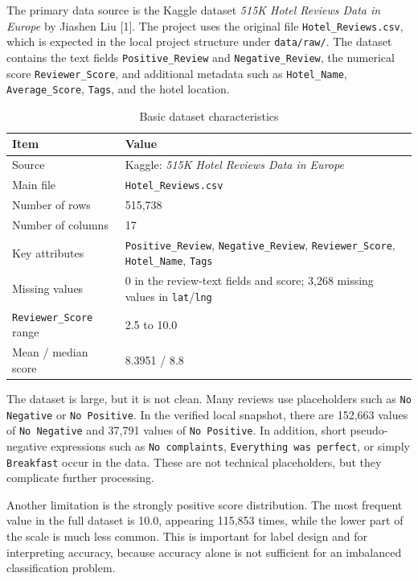\documentclass[twoside, 12pt]{article}
\begin{document}
The primary data source is the Kaggle dataset \emph{515K Hotel Reviews Data in Europe} by Jiashen Liu [1]. The project uses the original file \texttt{Hotel\_Reviews.csv}, which is expected in the local project structure under \texttt{data/raw/}. The dataset contains the text fields \texttt{Positive\_Review} and \texttt{Negative\_Review}, the numerical score \texttt{Reviewer\_Score}, and additional metadata such as \texttt{Hotel\_Name}, \texttt{Average\_Score}, \texttt{Tags}, and the hotel location.

\begin{table}[H]
\centering
\caption{Basic dataset characteristics}
\begin{tabular}{|p{5.2cm}|p{8cm}|}
\hline
\textbf{Item} & \textbf{Value} \\ \hline
Source & Kaggle: \emph{515K Hotel Reviews Data in Europe} \\ \hline
Main file & \texttt{Hotel\_Reviews.csv} \\ \hline
Number of rows & 515,738 \\ \hline
Number of columns & 17 \\ \hline
Key attributes & \texttt{Positive\_Review}, \texttt{Negative\_Review}, \texttt{Reviewer\_Score}, \texttt{Hotel\_Name}, \texttt{Tags} \\ \hline
Missing values & 0 in the review-text fields and score; 3,268 missing values in \texttt{lat}/\texttt{lng} \\ \hline
\texttt{Reviewer\_Score} range & 2.5 to 10.0 \\ \hline
Mean / median score & 8.3951 / 8.8 \\ \hline
\end{tabular}
\end{table}


The dataset is large, but it is not clean. Many reviews use placeholders such as \texttt{No Negative} or \texttt{No Positive}. In the verified local snapshot, there are 152,663 values of \texttt{No Negative} and 37,791 values of \texttt{No Positive}. In addition, short pseudo-negative expressions such as \texttt{No complaints}, \texttt{Everything was perfect}, or simply \texttt{Breakfast} occur in the data. These are not technical placeholders, but they complicate further processing.

Another limitation is the strongly positive score distribution. The most frequent value in the full dataset is 10.0, appearing 115,853 times, while the lower part of the scale is much less common. This is important for label design and for interpreting accuracy, because accuracy alone is not sufficient for an imbalanced classification problem.
\end{document}
